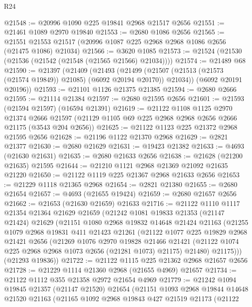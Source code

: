 \begin{lexlean}{R24}
\begin{coremodule}
@21548 := @20996 @1090 @225 @19841 @2968 @21517 @2656
@21551 := @21461 @1089 @2970 @19840
@21553 := @2680 @1086 @2656
@21565 := @21551 @21553 @21517 (@20996 @1087 @225 @2968 @2968 @1086 @2656 (@21475 @1086) @21034)
@21566 := @3620 @1085
@21573 := @21524 (@21530 (@21536 (@21542 (@21548 (@21565 @21566) @21034))))
@21574 := @21489 @68
@21590 := @21397
    (@21409
      (@21493
        (@21499 (@21507 (@21513 (@21573 (@21574 @19849)) @21085) (@6092 @20194 @20170)) @21034))
      (@6092 @20191 @20196))
@21593 := @21101 @1126 @21375 @21385
@21594 := @2680 @2666
@21595 := @21114 @21384
@21597 := @2680 @21595 @2656
@21601 := @21593 (@21594 @21597) (@16594 @21391)
@21619 := @21122
    @1108
    @1125
    @2970
    @21374
    @2666
    @21597
    (@21129 @1105 @69 @225 @2968 @2968 @2656 @2666 @21175 (@3543 @204 @2656))
@21625 := @21122 @1123 @225 @21372 @2968 @21595 @2656
@21628 := @21196 @1122 @21370 @2968
@21629 := @2821 @21377
@21630 := @2680 @21629
@21631 := @19423 @21382
@21633 := @4693 (@21630 @21631)
@21635 := @2680 @21633 @2656
@21638 := @21628 (@21200 @21635) @21595
@21644 := @21210 @1121 @2968 @21369 @21092 @21635 @21220
@21650 := @21122 @1119 @225 @21367 @2968 @21633 @2656
@21653 := @21229 @1118 @21365 @2968
@21654 := @2821 @21380
@21655 := @2680 @21654
@21657 := @4693 (@21655 @19424)
@21659 := @2680 @21657 @2656
@21662 := @21653 (@21630 @21659) @21633
@21716 := @21122
    @1110
    @1117
    @21354
    @21364
    @21629
    @21659
    (@21242
      @1081
      @19833
      @21353
      (@21147 @21424)
      @21629
      (@21151
        @1080
        @2968
        @19832
        @14648
        @21424
        @21163
        (@21255
          @1079
          @2968
          @19831
          @411
          @21423
          @21261
          (@21122
            @1077
            @225
            @19829
            @2968
            @21421
            @2656
            (@21269
              @1076
              @2970
              @19828
              @21466
              @21421
              (@21122 @1074 @225 @2968 @2968 @1073 @2656 (@21281 @1073) @21175)
              @21480)
            @21175)))
      (@21293 @19836))
@21722 := @21122 @1115 @225 @21362 @2968 @21657 @2656
@21728 := @21229 @1114 @21360 @2968 (@21655 @4969) @21657
@21734 := @21122 @1112 @355 @21358 @2972 @21654 @4969
@21779 := @21242
    @1094
    @19845
    @21357
    (@21147 @21520)
    @21654
    (@21151
      @1093
      @2968
      @19844
      @14648
      @21520
      @21163
      (@21165
        @1092
        @2968
        @19843
        @427
        @21519
        @21173
        (@21122

\end{coremodule}
\end{lexlean}
